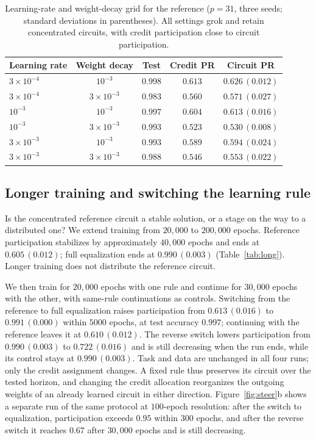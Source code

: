 \documentclass{article} %
\begin{document}
\begin{table}[!ht]
\caption{Learning-rate and weight-decay grid for the reference ($p=31$, three seeds; standard deviations in parentheses). All settings grok and retain concentrated circuits, with credit participation close to circuit participation.}
\label{tab:bpgrid}
\begin{center}
\small
\begin{tabular}{lcccc}
\toprule
Learning rate & Weight decay & Test & Credit PR & Circuit PR \\
\midrule
$3\times10^{-4}$ & $10^{-3}$        & $0.998$ & $0.613$ & $0.626\,(0.012)$ \\
$3\times10^{-4}$ & $3\times10^{-3}$ & $0.983$ & $0.560$ & $0.571\,(0.027)$ \\
$10^{-3}$        & $10^{-3}$        & $0.997$ & $0.604$ & $0.613\,(0.016)$ \\
$10^{-3}$        & $3\times10^{-3}$ & $0.993$ & $0.523$ & $0.530\,(0.008)$ \\
$3\times10^{-3}$ & $10^{-3}$        & $0.993$ & $0.589$ & $0.594\,(0.024)$ \\
$3\times10^{-3}$ & $3\times10^{-3}$ & $0.988$ & $0.546$ & $0.553\,(0.022)$ \\
\bottomrule
\end{tabular}
\end{center}
\end{table}

\subsection{Longer training and switching the learning rule}
\label{app:long}
Is the concentrated reference circuit a stable solution, or a stage on the way to a distributed one? We extend training from $20{,}000$ to $200{,}000$ epochs. Reference participation stabilizes by approximately $40{,}000$ epochs and ends at $0.605\,(0.012)$; full equalization ends at $0.990\,(0.003)$ (Table~\ref{tab:long}). Longer training does not distribute the reference circuit.

We then train for $20{,}000$ epochs with one rule and continue for $30{,}000$ epochs with the other, with same-rule continuations as controls. Switching from the reference to full equalization raises participation from $0.613\,(0.016)$ to $0.991\,(0.000)$ within $5000$ epochs, at test accuracy $0.997$; continuing with the reference leaves it at $0.610\,(0.012)$. The reverse switch lowers participation from $0.990\,(0.003)$ to $0.722\,(0.016)$ and is still decreasing when the run ends, while its control stays at $0.990\,(0.003)$. Task and data are unchanged in all four runs; only the credit assignment changes. A fixed rule thus preserves its circuit over the tested horizon, and changing the credit allocation reorganizes the outgoing weights of an already learned circuit in either direction. Figure~\ref{fig:steer}b shows a separate run of the same protocol at $100$-epoch resolution: after the switch to equalization, participation exceeds $0.95$ within $300$ epochs, and after the reverse switch it reaches $0.67$ after $30{,}000$ epochs and is still decreasing.
\end{document}
